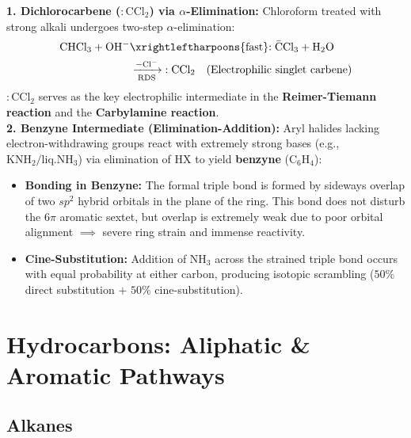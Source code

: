\documentclass[10pt,twoside,openright]{book}
\begin{document}
\begin{conceptbox}
\textbf{1. Dichlorocarbene ($:\mathrm{CCl_2}$) via $\alpha$-Elimination:}
Chloroform treated with strong alkali undergoes two-step $\alpha$-elimination:
\begin{align}
  \mathrm{CHCl_3} + \mathrm{OH^-} &\xrightleftharpoons{\text{fast}} \mathrm{:\bar{C}Cl_3} + \mathrm{H_2O} \\
  &\xrightarrow[\text{RDS}]{-\mathrm{Cl^-}} \mathbf{:\mathrm{CCl_2}} \quad (\text{Electrophilic singlet carbene})
\end{align}
$:\mathrm{CCl_2}$ serves as the key electrophilic intermediate in the \textbf{Reimer-Tiemann reaction} and the \textbf{Carbylamine reaction}.\\
\textbf{2. Benzyne Intermediate (Elimination-Addition):}
Aryl halides lacking electron-withdrawing groups react with extremely strong bases (e.g., $\mathrm{KNH_2 / liq. NH_3}$) via elimination of $\mathrm{HX}$ to yield \textbf{benzyne} ($\mathrm{C_6H_4}$):
\begin{itemize}
  \item \textbf{Bonding in Benzyne:} The formal triple bond is formed by sideways overlap of two $sp^2$ hybrid orbitals in the plane of the ring. This bond does not disturb the $6\pi$ aromatic sextet, but overlap is extremely weak due to poor orbital alignment $\implies$ severe ring strain and immense reactivity.
  \item \textbf{Cine-Substitution:} Addition of $\mathrm{NH_3}$ across the strained triple bond occurs with equal probability at either carbon, producing isotopic scrambling ($50\%$ direct substitution $+$ $50\%$ cine-substitution).
\end{itemize}
\end{conceptbox}

\section{Hydrocarbons: Aliphatic \& Aromatic Pathways}

\subsection{Alkanes}
\end{document}
